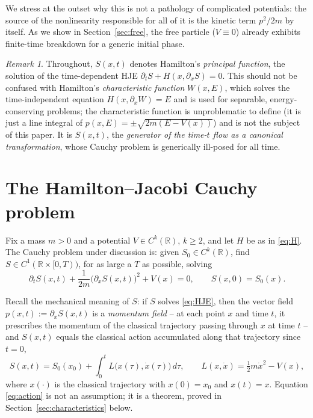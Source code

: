 \documentclass[11pt]{article}
\theoremstyle{plain}
\theoremstyle{definition}
\theoremstyle{remark}
\newtheorem{remark}[theorem]{Remark}
\begin{document}
We stress at the outset why this is not a pathology of complicated potentials:
the source of the nonlinearity responsible for all of it is the kinetic term
$p^2/2m$ by itself. As we show in Section~\ref{sec:free}, the free particle
($V\equiv 0$) already exhibits finite-time breakdown for a generic initial
phase.

\begin{remark}
    Throughout, $S(x,t)$ denotes Hamilton's \emph{principal function}, the solution
    of the time-dependent HJE $\partial_tS + H(x,\partial_xS)=0$. This should
    not be confused with Hamilton's \emph{characteristic function} $W(x,E)$,
    which solves the time-independent equation $H(x,\partial_xW)=E$ and is used
    for separable, energy-conserving problems; the characteristic function is
    unproblematic to define (it is just a line integral of
    $p(x,E)=\pm\sqrt{2m(E-V(x))}$) and is not the subject of this paper. It is
    $S(x,t)$, the \emph{generator of the time-$t$ flow as a canonical
    transformation}, whose Cauchy problem is generically ill-posed for all
    time.
\end{remark}

\section{The Hamilton--Jacobi Cauchy problem}
\label{sec:setup}

Fix a mass $m>0$ and a potential $V\in C^k(\mathbb{R})$, $k\ge 2$, and let $H$
be as in \eqref{eq:H}. The Cauchy problem under discussion is: given 
$S_0 \in C^k(\mathbb{R})$, 
find $S\in C^1(\mathbb{R}\times[0,T))$, for as large a $T$ as
possible, solving
\begin{equation}
\partial_t S(x,t) + \frac{1}{2m}\big(\partial_x S(x,t)\big)^2 + V(x) = 0, \qquad S(x,0)=S_0(x).
\label{eq:HJE}
\end{equation}

Recall the mechanical meaning of $S$: if $S$ solves \eqref{eq:HJE}, then the
vector field $p(x,t):=\partial_xS(x,t)$ is a \emph{momentum field} -- at each
point $x$ and time $t$, it prescribes the momentum of the classical trajectory
passing through $x$ at time $t$ -- and $S(x,t)$ equals the classical action
accumulated along that trajectory since $t=0$,
\begin{equation}
S(x,t) = S_0(x_0) + \int_0^t L\big(x(\tau),\dot x(\tau)\big)\,d\tau, \qquad L(x,\dot x)=\tfrac12 m\dot x^2 - V(x),
\label{eq:action}
\end{equation}
where $x(\cdot)$ is the classical trajectory with $x(0)=x_0$ and $x(t)=x$.
Equation \eqref{eq:action} is not an assumption; it is a theorem, proved in
Section~\ref{sec:characteristics} below.
\end{document}
